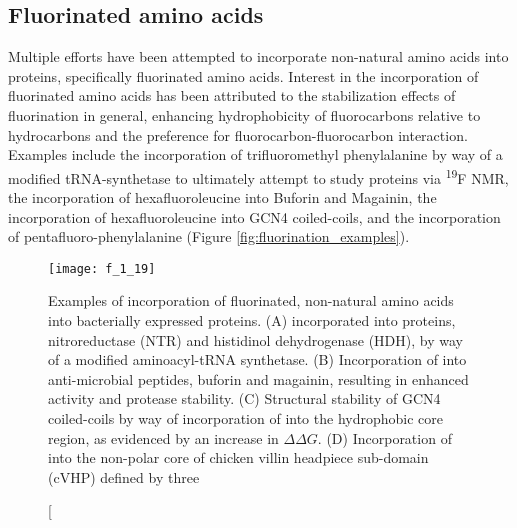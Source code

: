 \begin{refsection}
\subsection{Fluorinated amino acids}
\label{sec:fluorinated_amino_acids}


Multiple efforts have been attempted to incorporate non-natural amino acids into
proteins, specifically fluorinated amino
acids.\cite{Meng2007,Lee2004,Son2006,Li2010a,Woll2006} Interest in the
incorporation of fluorinated amino acids has been attributed to the
stabilization effects of fluorination in general, enhancing hydrophobicity of
fluorocarbons relative to hydrocarbons and the preference for
fluorocarbon-fluorocarbon
interaction.\cite{Woll2006,Lee2004,Marsh2009,Jackel2006,Yoder2002} Examples
include the incorporation of trifluoromethyl phenylalanine by way of a modified
tRNA-synthetase to ultimately attempt to study  proteins via
\textsuperscript{19}F NMR,\cite{Li2010a,Jackson2007} the incorporation of hexafluoroleucine into
Buforin and Magainin,\cite{Meng2007} the incorporation of hexafluoroleucine into
GCN4 coiled-coils,\cite{Lee2004} and the incorporation of
pentafluoro-phenylalanine\cite{Woll2006} (Figure
\ref{fig:fluorination_examples}).
\begin{figure}[h!] \centering \texttt{[image: f\_1\_19]}
    \caption[Examples of incorporation of fluorinated, non-natural amino acids
        into bacterially expressed proteins.
        (A)
         incorporated into
         proteins, nitroreductase (NTR) and histidinol
        dehydrogenase (HDH), by way of a modified aminoacyl-tRNA
        synthetase.
        (B)
        Incorporation of  into anti-microbial
        peptides, buforin and magainin, resulting in enhanced activity and
        protease stability.
        (C) Structural stability of GCN4 coiled-coils by way
        of incorporation of  into the hydrophobic
        core region, as evidenced by an increase in ${\Delta\Delta G}$.
        (D)
        Incorporation of  into the non-polar
        core of chicken villin headpiece sub-domain (cVHP) defined by three

\end{figure}
\end{refsection}
